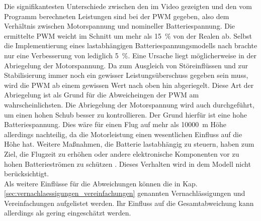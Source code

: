 Die signifikantesten Unterschiede zwischen den im Video gezeigten und den vom Programm berechneten Leistungen sind bei der PWM gegeben, also dem Verhältnis zwischen Motorspannung und nomineller Batteriespannung. Die ermittelte PWM weicht im Schnitt um mehr als \SI{15}{\%} von der Realen ab. Selbst die Implementierung eines lastabhängigen Batteriespannungsmodells nach \cite{Tremblay.2009} brachte nur eine Verbesserung von lediglich \SI{5}{\%}. Eine Ursache liegt möglicherweise in der Abriegelung der Motorspannung. Da zum Ausgleich von Störeinflüssen und zur Stabilisierung immer noch ein gewisser Leistungsüberschuss gegeben sein muss, wird die PWM ab einem gewissen Wert nach oben hin abgeriegelt. Diese Art der Abriegelung ist als Grund für die Abweicheingen der PWM am wahrscheinlichsten. Die Abriegelung der Motorspannung wird auch durchgeführt, um einen hohen Schub besser zu kontrollieren. Der Grund hierfür ist eine hohe Batteriespannung. Dies wäre für einen Flug auf mehr als \SI{10000}{m} Höhe allerdings nachteilig, da die Motorleistung einen wesentlichen Einfluss auf die Höhe hat. Weitere Maßnahmen, die Batterie lastabhängig zu steuern, haben zum Ziel, die Flugzeit zu erhöhen oder andere elektronische Komponenten vor zu hohen Batterieströmen zu schützen \cite{arducopter.clav,arducopter.mts,betaflight}.
Dieses Verhalten wird in dem Modell nicht berücksichtigt. \\
Als weitere Einflüsse für die Abweichungen können die in Kap. \ref{sec:vernachlaessigungen_vereinfachungen} genannten Vernachlässigungen und Vereinfachungen aufgelistet werden. Ihr Einfluss auf die Gesamtabweichung kann allerdings als gering eingeschätzt werden.

